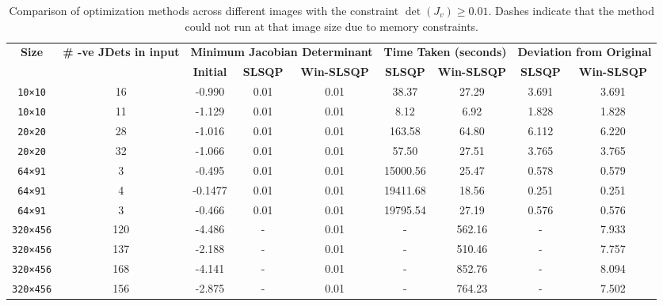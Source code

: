 \begin{table}[ht]
\centering
\caption{Comparison of optimization methods across different images with the constraint $\det(J_v)\geq 0.01$. Dashes indicate that the method could not run at that image size due to memory constraints.}
\label{tab:jac_results}
\renewcommand{\arraystretch}{1.2}
\begin{tabular}{|c|c|ccc|cc|cc|}
\hline
\textbf{Size} &
\textbf{\# -ve JDets in input} &
\multicolumn{3}{c|}{\textbf{Minimum Jacobian Determinant}} &
\multicolumn{2}{c|}{\textbf{Time Taken (seconds)}} &
\multicolumn{2}{c|}{\textbf{Deviation from Original}} \\
\cline{3-9}
 &  & \textbf{Initial} &
\textbf{SLSQP} & \textbf{Win-SLSQP} &
\textbf{SLSQP} & \textbf{Win-SLSQP} &
\textbf{SLSQP} & \textbf{Win-SLSQP} \\
\hline


\texttt{10×10} & 16 & -0.990 & 0.01 & 0.01 & 38.37 & 27.29 & 3.691 & 3.691 \\   %
\texttt{10×10} & 11 & -1.129 & 0.01 & 0.01 & 8.12 & 6.92   & 1.828 & 1.828 \\   %
\texttt{20×20} & 28 & -1.016 & 0.01 & 0.01 & 163.58 & 64.80 & 6.112 & 6.220 \\  %
\texttt{20×20} & 32 & -1.066 & 0.01 & 0.01 & 57.50 & 27.51 & 3.765 & 3.765 \\      %
\texttt{64×91} & 3 & -0.495 & 0.01 & 0.01 & 15000.56 & 25.47 & 0.578 & 0.579 \\  %
\texttt{64×91} & 4 & -0.1477 & 0.01 &0.01 & 19411.68 & 18.56 & 0.251 & 0.251 \\  %
\texttt{64×91} & 3 & -0.466 & 0.01 & 0.01 & 19795.54 & 27.19 & 0.576 & 0.576 \\ %
\texttt{320×456} & 120 & -4.486 & -  & 0.01 & - & 562.16 & - & 7.933  \\  %
\texttt{320×456} & 137 & -2.188 & - & 0.01 & - & 510.46 & - & 7.757  \\  %
\texttt{320×456} & 168 & -4.141 & -  & 0.01 & - & 852.76 & - & 8.094  \\  %
\texttt{320×456} & 156 & -2.875 & - & 0.01 & - &  764.23 & - & 7.502  \\  %

\hline
\end{tabular}
\end{table}

